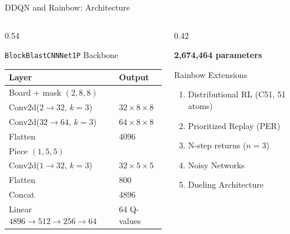 \documentclass[aspectratio=169,10pt]{beamer}
\begin{document}
\begin{frame}{DDQN and Rainbow: Architecture}
\begin{columns}[T]
\begin{column}{0.54\textwidth}
\begin{block}{\texttt{BlockBlastCNNNet1P} Backbone}
\begin{tabular}{ll}
\toprule
Layer & Output \\
\midrule
Board + mask $(2,8,8)$ & \\
Conv2d($2\to32$, $k=3$) & $32\times8\times8$ \\
Conv2d($32\to64$, $k=3$) & $64\times8\times8$ \\
Flatten & 4096 \\
\midrule
Piece $(1,5,5)$ & \\
Conv2d($1\to32$, $k=3$) & $32\times5\times5$ \\
Flatten & 800 \\
\midrule
Concat & 4896 \\
Linear $4896\to512\to256\to64$ & 64 Q-values \\
\bottomrule
\end{tabular}
\end{block}
\end{column}

\begin{column}{0.42\textwidth}
\begin{alertblock}{\textbf{2,674,464 parameters}}
\end{alertblock}

\vspace{0.5em}
\begin{block}{Rainbow Extensions}
\begin{enumerate}
    \item Distributional RL (C51, 51 atoms)
    \item Prioritized Replay (PER)
    \item N-step returns ($n=3$)
    \item Noisy Networks
    \item Dueling Architecture
\end{enumerate}
\end{block}
\end{column}
\end{columns}
\end{frame}
\end{document}
